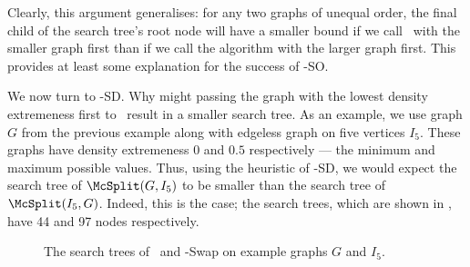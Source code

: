 Clearly, this argument generalises: for any two graphs of unequal order,
the final child of the search tree's root node will have a smaller bound
if we call \McSplit\ with the smaller graph first than if we call the algorithm
with the larger graph first.  This provides at least some explanation for the success of
\McSplit-SO.

We now turn to \McSplit-SD.  Why might passing the graph with the lowest density
extremeness first to \McSplit\ result in a smaller search tree.  As an example, we
use graph $G$ from the previous example along with edgeless graph on five vertices
$I_5$.  These graphs have density extremeness $0$ and $0.5$ respectively --- the
minimum and maximum possible values.  Thus, using the heuristic of \McSplit-SD,
we would expect the search tree of $\McSplit(G, I_5)$ to be smaller than the search
tree of $\McSplit(I_5, G)$.  Indeed, this is the case; the search trees,
which are shown in , have 44
and 97 nodes respectively.

\begin{figure}[htb]
    \centering
    \caption{The search trees of \McSplit\ and \McSplit-Swap on example graphs $G$ and $I_5$.}
        \label{figure:search-trees-gi-with-swapping}
\end{figure}

